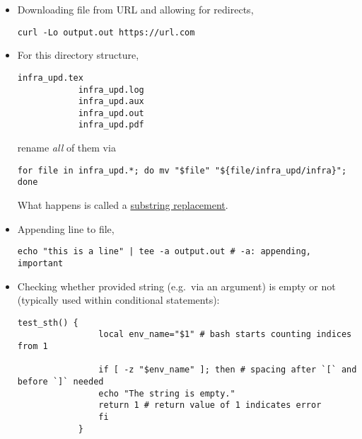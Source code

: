 \documentclass[12pt, a4paper]{article}
\numberwithin{equation}{section}
\theoremstyle{definition}
\theoremstyle{definition}
\begin{document}
	\begin{itemize}
		\item Downloading file from URL and allowing for redirects, 
		
		\begin{lstlisting}[style=mystylebash, label=alg:curl, xleftmargin=\parindent]
			curl -Lo output.out https://url.com
		\end{lstlisting}
	
		\item For this directory structure, 
		
		\begin{lstlisting}[style=mystylebash, label=alg:exmp__dir_struc, caption=Example directory structure, xleftmargin=\parindent]
			infra_upd.tex
			infra_upd.log
			infra_upd.aux
			infra_upd.out
			infra_upd.pdf
		\end{lstlisting} 
		
		rename \textit{all} of them via
		
		\begin{lstlisting}[style=mystylebash, label=alg:linux_mv_files_for, xleftmargin=\parindent]
			for file in infra_upd.*; do mv "$file" "${file/infra_upd/infra}"; done
		\end{lstlisting}
		
		What happens is called a 	\href{https://stackoverflow.com/questions/13210880/replace-one-substring-for-another-string-in-shell-script}{\color{blue}substring replacement}. 
		
		\item Appending line to file,
		
		\begin{lstlisting}[style=mystylebash, label=alg:ubuntu__line_appending, xleftmargin=\parindent]
			echo "this is a line" | tee -a output.out # -a: appending, important
		\end{lstlisting}
		
		\item Checking whether provided string (e.g.~via an argument) is empty or not (typically used within conditional statements): 
		
		\begin{lstlisting}[style=mystylebash, label=alg:bash__empty_string_check, caption=Check (e.g.~in if-clause) whether string is empty or not, xleftmargin=\parindent]
			test_sth() {
				local env_name="$1" # bash starts counting indices from 1
				
				if [ -z "$env_name" ]; then # spacing after `[` and before `]` needed
				echo "The string is empty."
				return 1 # return value of 1 indicates error
				fi
			}
		\end{lstlisting}
	

\end{itemize}
\end{document}

